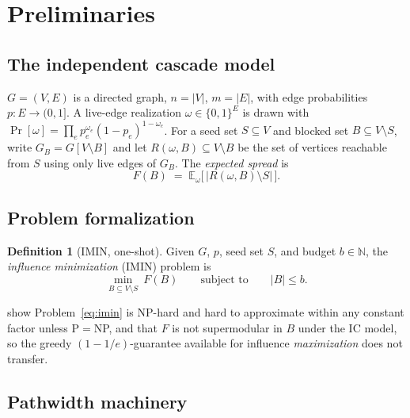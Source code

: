 \documentclass[11pt]{article}
\theoremstyle{definition}
\newtheorem{definition}{Definition}
\theoremstyle{remark}
\newcommand{\Rspread}{R}
\newcommand{\FF}{F}
\begin{document}
\section{Preliminaries}\label{sec:prelim}
\subsection{The independent cascade model}\label{sec:ic-model}

$G=(V,E)$ is a directed graph,
$n=|V|$, $m=|E|$, with edge probabilities $p:E\to(0,1]$. A live-edge
realization $\omega\in\{0,1\}^E$ is drawn with
$\Pr[\omega]=\prod_{e}p_e^{\omega_e}(1-p_e)^{1-\omega_e}$. For a seed set
$S\subseteq V$ and blocked set $B\subseteq V\setminus S$, write
$G_B=G[V\setminus B]$ and let $\Rspread(\omega,B)\subseteq V\setminus B$ be
the set of vertices reachable from $S$ using only live edges of $G_B$. The
\emph{expected spread} is
\begin{equation}\label{eq:spread}
\FF(B)\;=\;\mathbb E_\omega\bigl[\,|\Rspread(\omega,B)\setminus S|\,\bigr].
\end{equation}

\subsection{Problem formalization}\label{sec:formalization}

\begin{definition}[IMIN, one-shot]\label{def:imin}
Given $G$, $p$, seed set $S$, and budget $b\in\mathbb N$, the
\emph{influence minimization} (IMIN) problem is
\begin{equation}\label{eq:imin}
\min_{B\subseteq V\setminus S}\ \FF(B)
\qquad\text{subject to}\qquad
|B|\le b.
\end{equation}
\end{definition}

\noindent \citet{xie2023} show Problem~\eqref{eq:imin} is NP-hard and hard
to approximate within any constant factor unless P$=$NP, and that $\FF$ is
not supermodular in $B$ under the IC model, so the greedy
$(1-1/e)$-guarantee available for influence \emph{maximization}
\citep{kempe2003} does not transfer.

\subsection{Pathwidth machinery}\label{sec:treewidth-prelim}
\end{document}
